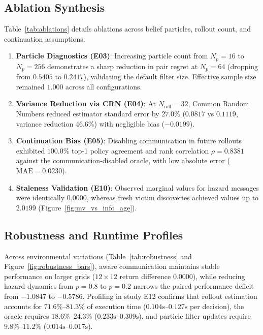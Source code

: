 \subsection{Ablation Synthesis}
Table~\ref{tab:ablations} details ablations across belief particles, rollout count, and continuation assumptions:
\begin{enumerate}
    \item \textbf{Particle Diagnostics (E03)}: Increasing particle count from $N_p=16$ to $N_p=256$ demonstrates a sharp reduction in pair regret at $N_p=64$ (dropping from $0.5405$ to $0.2417$), validating the default filter size. Effective sample size remained $1.000$ across all configurations.
    \item \textbf{Variance Reduction via CRN (E04)}: At $N_{\mathrm{roll}}=32$, Common Random Numbers reduced estimator standard error by $27.0\%$ ($0.0817$ vs $0.1119$, variance reduction $46.6\%$) with negligible bias ($-0.0199$).
    \item \textbf{Continuation Bias (E05)}: Disabling communication in future rollouts exhibited $100.0\%$ top-1 policy agreement and rank correlation $\rho = 0.8381$ against the communication-disabled oracle, with low absolute error ($\mathrm{MAE} = 0.0230$).
    \item \textbf{Staleness Validation (E10)}: Observed marginal values for hazard messages were identically $0.0000$, whereas fresh victim discoveries achieved values up to $2.0199$ (Figure~\ref{fig:mv_vs_info_age}).
\end{enumerate}

\subsection{Robustness and Runtime Profiles}
Across environmental variations (Table~\ref{tab:robustness} and Figure~\ref{fig:robustness_bars}), aware communication maintains stable performance on larger grids ($12\times 12$ return difference $0.0000$), while reducing hazard dynamics from $p=0.8$ to $p=0.2$ narrows the paired performance deficit from $-1.0847$ to $-0.5786$. Profiling in study E12 confirms that rollout estimation accounts for $71.6\%$--$81.3\%$ of execution time ($0.104\text{s}$--$0.127\text{s}$ per decision), the oracle requires $18.6\%$--$24.3\%$ ($0.233\text{s}$--$0.309\text{s}$), and particle filter updates require $9.8\%$--$11.2\%$ ($0.014\text{s}$--$0.017\text{s}$).
